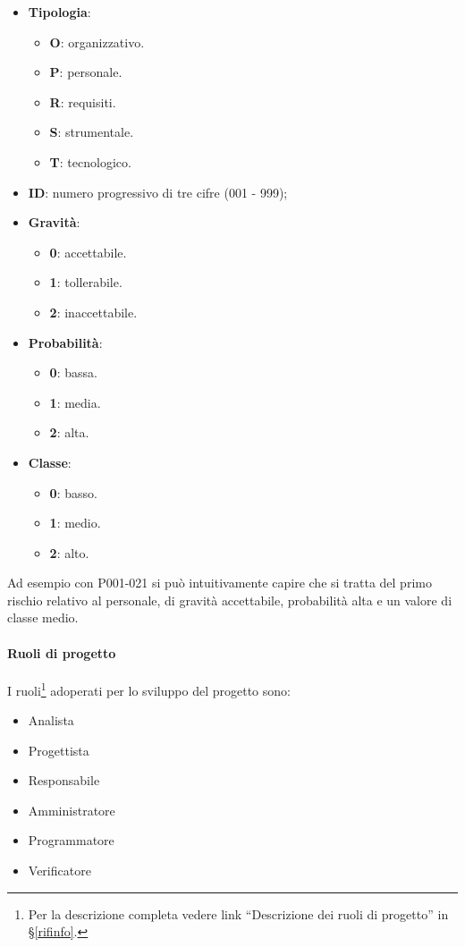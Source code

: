 			\begin{itemize}
				\item \textbf{Tipologia}:
				\begin{itemize}
					\item \textbf{O}: organizzativo.
					\item \textbf{P}: personale.
					\item \textbf{R}: requisiti.
					\item \textbf{S}: strumentale.
					\item \textbf{T}: tecnologico.
				\end{itemize}
				
				\item \textbf{ID}: numero progressivo di tre cifre (001 - 999);
				\item \textbf{Gravità}:
				\begin{itemize}
					\item \textbf{0}: accettabile.
					\item \textbf{1}: tollerabile.
					\item \textbf{2}: inaccettabile.
				\end{itemize}
				
				\item \textbf{Probabilità}:
				\begin{itemize}
					\item \textbf{0}: bassa.
					\item \textbf{1}: media.
					\item \textbf{2}: alta.
				\end{itemize}
				
				\item \textbf{Classe}:
				\begin{itemize}
					\item \textbf{0}: basso.
					\item \textbf{1}: medio.
					\item \textbf{2}: alto.
				\end{itemize}
			\end{itemize}
			
			Ad esempio con P001-021 si può intuitivamente capire che si tratta del primo rischio relativo al personale, di gravità accettabile, probabilità alta e un valore di classe medio.
			
			\paragraph{Ruoli di progetto}
			I ruoli\footnote{Per la descrizione completa vedere link ``Descrizione dei ruoli di progetto'' in \S\ref{rifinfo}.} adoperati per lo sviluppo del progetto sono:
			\begin{itemize}[noitemsep]
				\item Analista
				\item Progettista
				\item Responsabile
				\item Amministratore
				\item Programmatore
				\item Verificatore
			\end{itemize}

